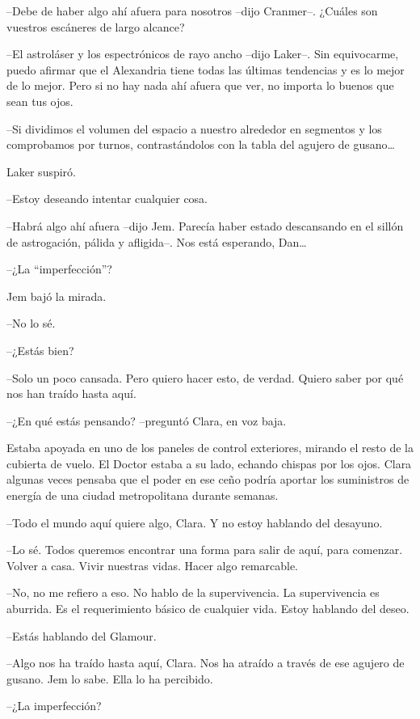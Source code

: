 {--Debe de haber algo ahí afuera para nosotros --dijo Cranmer--. ¿Cuáles
son vuestros escáneres de largo alcance?}

{--El astroláser y los espectrónicos de rayo ancho --dijo Laker--. Sin
 equivocarme, puedo afirmar que el Alexandria tiene todas las últimas
 tendencias y es lo mejor de lo mejor. Pero si no hay nada ahí afuera que
ver, no importa lo buenos que sean tus ojos.}

{--Si dividimos el volumen del espacio a nuestro alrededor en segmentos y
 los comprobamos por turnos, contrastándolos con la tabla del agujero de
 gusano\ldots{}}

{Laker suspiró.}

{--Estoy deseando intentar cualquier cosa.}

{--Habrá algo ahí afuera --dijo Jem. Parecía haber estado descansando en
 el sillón de astrogación, pálida y afligida--. Nos está esperando,
 Dan\ldots{}}

{--¿La ``imperfección''?}

{Jem bajó la mirada.}

{--No lo sé.}

{--¿Estás bien?}

{--Solo un poco cansada. Pero quiero hacer esto, de verdad. Quiero saber
 por qué nos han traído hasta aquí.}

{--¿En qué estás
pensando? --preguntó Clara, en voz baja.}

{Estaba apoyada en uno de los paneles de control exteriores, mirando el
 resto de la cubierta de vuelo. El Doctor estaba a su lado, echando
 chispas por los ojos. Clara algunas veces pensaba que el poder en ese
 ceño podría aportar los suministros de energía de una ciudad
metropolitana durante semanas.}

{--Todo el mundo aquí quiere algo, Clara. Y no estoy hablando del
desayuno.}

{--Lo sé. Todos queremos encontrar una forma para salir de aquí, para
comenzar. Volver a casa. Vivir nuestras vidas. Hacer algo remarcable.}

{--No, no me refiero a eso. No hablo de la supervivencia. La
 supervivencia es aburrida. Es el requerimiento básico de cualquier vida.
Estoy hablando del deseo.}

{--Estás hablando del Glamour.}

{--Algo nos ha traído hasta aquí, Clara. Nos ha atraído a través de ese
agujero de gusano. Jem lo sabe. Ella lo ha percibido.}

{--¿La imperfección?}

